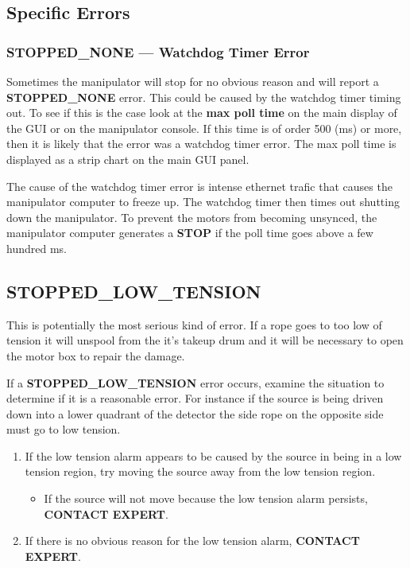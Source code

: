 
\newpage 
\subsection{Specific Errors}
  
\subsubsection{STOPPED\_NONE --- Watchdog Timer Error}
  Sometimes the manipulator will stop for no obvious reason and
will report a {\bf STOPPED\_NONE} error.   This could be caused by
the watchdog timer timing out.  To see if this is the case look
at the {\bf max poll time} on the main display of the GUI or on the
manipulator console.  If this time is of order 500 (ms) or more, then
it is likely that the error was a watchdog timer error.  The max
poll time is displayed as a strip chart on the main GUI panel.  
  
  The cause of the watchdog timer error is intense ethernet trafic
that causes the manipulator computer to freeze up.  The watchdog timer
then times out shutting down the manipulator.  To prevent the motors
from becoming unsynced, the manipulator computer generates a {\bf STOP}
if the poll time goes above a few hundred ms.

  
\subsection{STOPPED\_LOW\_TENSION}
  This is potentially the most serious kind of error.  If a rope
goes to too low of tension it will unspool from the it's takeup drum
and it will be necessary to open the motor box to repair the damage.

  If a {\bf STOPPED\_LOW\_TENSION} error occurs, examine the situation
to determine if it is a reasonable error.  For instance if the source
is being driven down into a lower quadrant of the detector the side rope
on the opposite side must go to low tension.  
  
\begin{enumerate}
\item If the low tension alarm appears to be caused by the source in
 being in a low tension region, try moving the source away from the 
  low tension region.
  \begin{itemize}
  \item If the source will not move because the low tension alarm persists,
    {\bf CONTACT EXPERT}.
  \end{itemize}
\item If there is no obvious reason for the low tension alarm, 
    {\bf CONTACT EXPERT}.  
\end{enumerate}
  
